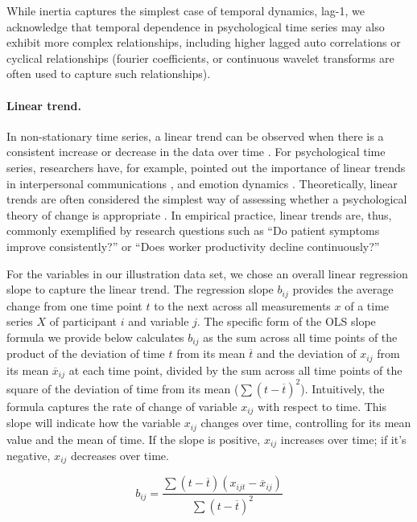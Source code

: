 While inertia captures the simplest case of temporal dynamics, lag-1, we
acknowledge that temporal dependence in psychological time series may
also exhibit more complex relationships, including higher lagged auto
correlations or cyclical relationships (fourier coefficients, or
continuous wavelet transforms are often used to capture such
relationships).

\paragraph{Linear trend.}

In non-stationary time series, a linear trend can be observed when there
is a consistent increase or decrease in the data over time
\citep{nyblom1986}. For psychological time series, researchers have, for
example, pointed out the importance of linear trends in interpersonal
communications \citep{vasileiadou2014}, and emotion dynamics
\citep{oravecz2016}. Theoretically, linear trends are often considered
the simplest way of assessing whether a psychological theory of change
is appropriate \citep{gottman1969}. In empirical practice, linear trends
are, thus, commonly exemplified by research questions such as ``Do
patient symptoms improve consistently?'' or ``Does worker productivity
decline continuously?''

For the variables in our illustration data set, we chose an overall
linear regression slope to capture the linear trend. The regression
slope \(b_{ij}\) provides the average change from one time point \(t\)
to the next across all measurements \(x\) of a time series \(X\) of
participant \(i\) and variable \(j\). The specific form of the OLS slope
formula we provide below calculates \(b_{ij}\) as the sum across all
time points of the product of the deviation of time \(t\) from its mean
\(\overline{t}\) and the deviation of \(x_{ij}\) from its mean
\(\overline{x}_{ij}\) at each time point, divided by the sum across all
time points of the square of the deviation of time from its mean
(\(\sum(t-\overline{t})^2\)). Intuitively, the formula captures the rate
of change of variable \(x_{ij}\) with respect to time. This slope will
indicate how the variable \(x_{ij}\) changes over time, controlling for
its mean value and the mean of time. If the slope is positive,
\(x_{ij}\) increases over time; if it's negative, \(x_{ij}\) decreases
over time.

\begin{equation} \label{eq:lin}
  b_{ij} = \frac{\sum(t-\overline{t})(x_{ijt}-\overline{x}_{ij})}{\sum(t-\overline{t})^2}
\end{equation}

